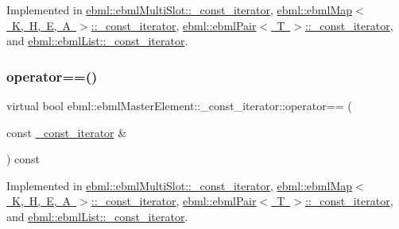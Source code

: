 Implemented in \mbox{\hyperlink{classebml_1_1ebmlMultiSlot_1_1__const__iterator_a6e2de45285786f1045fef8be51974b0b}{ebml\+::ebml\+Multi\+Slot\+::\+\_\+const\+\_\+iterator}}, \mbox{\hyperlink{classebml_1_1ebmlMap_1_1__const__iterator_a641afb65930e85882c6397d2f0930604}{ebml\+::ebml\+Map$<$ K, H, E, A $>$\+::\+\_\+const\+\_\+iterator}}, \mbox{\hyperlink{classebml_1_1ebmlPair_1_1__const__iterator_a84535e268f7488e9acff8e5d35de4f38}{ebml\+::ebml\+Pair$<$ T $>$\+::\+\_\+const\+\_\+iterator}}, and \mbox{\hyperlink{classebml_1_1ebmlList_1_1__const__iterator_a10b96fa207ad1c24cb2374c1ee417646}{ebml\+::ebml\+List\+::\+\_\+const\+\_\+iterator}}.

\mbox{\label{classebml_1_1ebmlMasterElement_1_1__const__iterator_a936395ed4c0c189a92927bfdf1e28586}} 
\subsubsection{\texorpdfstring{operator==()}{operator==()}}
{\footnotesize\ttfamily virtual bool ebml\+::ebml\+Master\+Element\+::\+\_\+const\+\_\+iterator\+::operator== (\begin{DoxyParamCaption}\item[{const \mbox{\hyperlink{classebml_1_1ebmlMasterElement_1_1__const__iterator}{\+\_\+const\+\_\+iterator}} \&}]{ }\end{DoxyParamCaption}) const\hspace{0.3cm}{\ttfamily [pure virtual]}}



Implemented in \mbox{\hyperlink{classebml_1_1ebmlMultiSlot_1_1__const__iterator_a874e71d4f6d86e1213c8381ec20f3069}{ebml\+::ebml\+Multi\+Slot\+::\+\_\+const\+\_\+iterator}}, \mbox{\hyperlink{classebml_1_1ebmlMap_1_1__const__iterator_aa0b4af1c5b7d8bdb26def33c2a329371}{ebml\+::ebml\+Map$<$ K, H, E, A $>$\+::\+\_\+const\+\_\+iterator}}, \mbox{\hyperlink{classebml_1_1ebmlPair_1_1__const__iterator_a2b9f927f8b57e7db13693581d6592e1e}{ebml\+::ebml\+Pair$<$ T $>$\+::\+\_\+const\+\_\+iterator}}, and \mbox{\hyperlink{classebml_1_1ebmlList_1_1__const__iterator_af5249ca7b9ac67296b1e92ffa804bce5}{ebml\+::ebml\+List\+::\+\_\+const\+\_\+iterator}}.



